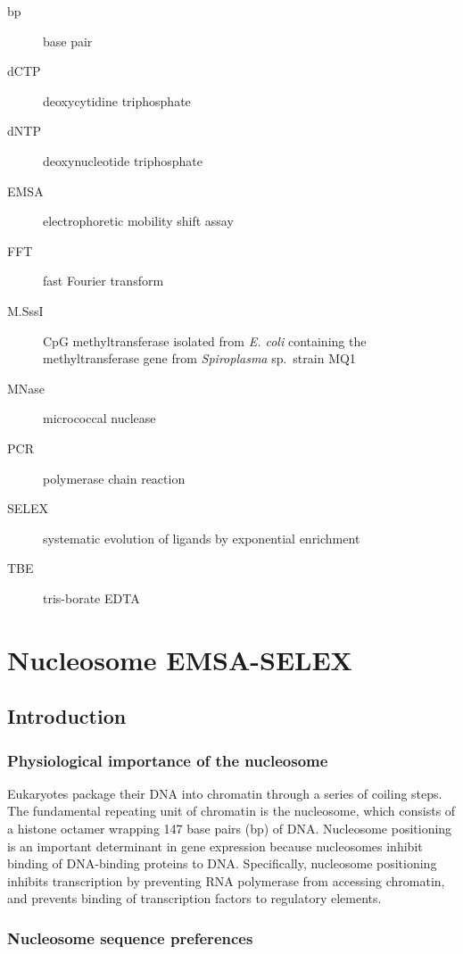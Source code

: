 \documentclass[a4paper, numbers=noenddot]{scrbook}
\begin{document}
\begin{description}
\item [bp] base pair
\item [dCTP] deoxycytidine triphosphate
\item [dNTP] deoxynucleotide triphosphate
\item [EMSA] electrophoretic mobility shift assay
\item [FFT] fast Fourier transform
\item [M.SssI] CpG methyltransferase isolated from \emph{E. coli} containing the methyltransferase gene from \emph{Spiroplasma} sp.\ strain MQ1
\item [MNase] micrococcal nuclease
\item [PCR] polymerase chain reaction
\item [SELEX] systematic evolution of ligands by exponential enrichment
\item [TBE] tris-borate EDTA
\end{description}

\mainmatter

\chapter{Nucleosome EMSA-SELEX}
\label{ch:emsaselex}

\section{Introduction}
\label{sec:emsaselex_intro}

\subsection{Physiological importance of the nucleosome}
\label{ssec:emsaselex_intro_importance}

Eukaryotes package their DNA into chromatin through a series of coiling steps.  The fundamental repeating unit of chromatin is the nucleosome, which consists of a histone octamer wrapping 147 base pairs (bp) of DNA.  Nucleosome positioning is an important determinant in gene expression because nucleosomes inhibit binding of DNA-binding proteins to DNA.  Specifically, nucleosome positioning inhibits transcription by preventing RNA polymerase from accessing chromatin, and prevents binding of transcription factors to regulatory elements.

\subsection{Nucleosome sequence preferences}
\label{ssec:emsaselex_intro_seqpref}
\end{document}
